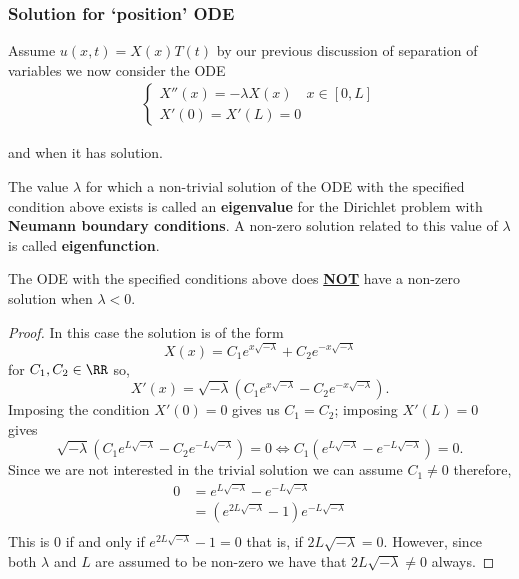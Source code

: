 \documentclass[12pt, a4paper]{article}
\begin{document}
\subsubsection{Solution for `position' ODE}

Assume \(u(x,t)=X(x)T(t)\) by our previous discussion of separation of variables we now consider the ODE 
\[\begin{aligned}
    \begin{cases}
        X''(x)=-\lambda X(x) \quad x \in [0,L] \\
        X'(0)=X'(L)=0
    \end{cases}
\end{aligned}\]

and when it has solution.

\begin{definition}
    The value \(\lambda\) for which a non-trivial solution of the ODE with the specified condition above exists is called an \textbf{eigenvalue} for the Dirichlet problem with \textbf{Neumann boundary conditions}. A non-zero solution related to this value of \(\lambda\) is called \textbf{eigenfunction}.
\end{definition}

\begin{mdthm}
    The ODE with the specified conditions above does \underline{\textbf{NOT}} have a non-zero solution when \(\lambda<0\).
\end{mdthm}

\begin{proof}
    In this case the solution is of the form 
    \[X(x)=C_1 e^{x\sqrt{-\lambda}}+C_2 e^{-x\sqrt{-\lambda}}\]
    for \(C_1,C_2 \in \RR\) so,
    \[X'(x)= \sqrt{-\lambda}\left( C_1 e^{x\sqrt{-\lambda}}-C_2 e^{-x\sqrt{-\lambda}} \right).\]
    Imposing the condition \(X'(0)=0\) gives us \(C_1=C_2\); imposing \(X'(L)=0\) gives 
    \[ \sqrt{-\lambda}\left( C_1 e^{L\sqrt{-\lambda}}-C_2 e^{-L\sqrt{-\lambda}} \right)=0 \iff C_1 \left( e^{L\sqrt{-\lambda}}-e^{-L\sqrt{-\lambda}} \right)=0.\]
    Since we are not interested in the trivial solution we can assume \(C_1 \neq 0\) therefore, 
    \[\begin{aligned}
        0 &= e^{L \sqrt{-\lambda}}-e^{-L\sqrt{-\lambda}} \\
        &= \left( e^{2L \sqrt{-\lambda}} -1\right)e^{-L \sqrt{-\lambda}} \\
    \end{aligned}\]
    This is \(0\) if and only if \(e^{2L \sqrt{-\lambda}} -1=0\) that is, if \(2L\sqrt{-\lambda}=0\). However, since both \(\lambda\) and \(L\) are assumed to be non-zero we have that \(2L \sqrt{-\lambda} \neq 0\) always.
\end{proof}
\end{document}

